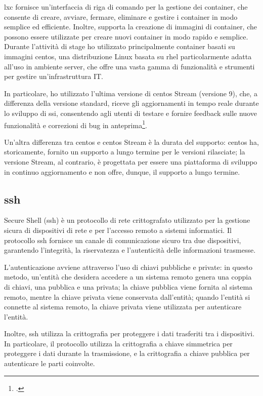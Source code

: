 \acrshort{lxc} fornisce un'interfaccia di riga di comando per la gestione dei container, che consente di creare, avviare, fermare, eliminare e gestire i container in modo semplice ed efficiente. Inoltre, supporta la creazione di immagini di container, che possono essere utilizzate per creare nuovi container in modo rapido e semplice.
\\
Durante l'attività di stage ho utilizzato principalmente container basati su immagini \acrshort{centos}, una distribuzione Linux basata su \acrshort{rhel} particolarmente adatta all'uso in ambiente server, che offre una vasta gamma di funzionalità e strumenti per gestire un'infrastruttura IT. 

In particolare, ho utilizzato l'ultima versione di \acrshort{centos} Stream (versione 9), che, a differenza della versione standard, riceve gli aggiornamenti in tempo reale durante lo sviluppo di \acrshort{ssi}, consentendo agli utenti di testare e fornire feedback sulle nuove funzionalità e correzioni di bug in anteprima\footcite{site:centos-stream}.

Un'altra differenza tra \acrshort{centos} e \acrshort{centos} Stream è la durata del supporto: \acrshort{centos} ha, storicamente, fornito un supporto a lungo termine per le versioni rilasciate; la versione Stream, al contrario, è progettata per essere una piattaforma di sviluppo in continuo aggiornamento e non offre, dunque, il supporto a lungo termine.

\subsection{\acrlong{ssh}}
Secure Shell (\acrshort{ssh}) è un protocollo di rete crittografato utilizzato per la gestione sicura di dispositivi di rete e per l'accesso remoto a sistemi informatici. Il protocollo \acrshort{ssh} fornisce un canale di comunicazione sicuro tra due dispositivi, garantendo l'integrità, la riservatezza e l'autenticità delle informazioni trasmesse.

L'autenticazione avviene attraverso l'uso di chiavi pubbliche e private: in questo metodo, un'entità che desidera accedere a un sistema remoto genera una coppia di chiavi, una pubblica e una privata; la chiave pubblica viene fornita al sistema remoto, mentre la chiave privata viene conservata dall'entità; quando l'entità si connette al sistema remoto, la chiave privata viene utilizzata per autenticare l'entità.

Inoltre, \acrshort{ssh} utilizza la crittografia per proteggere i dati trasferiti tra i dispositivi. In particolare, il protocollo utilizza la crittografia a chiave simmetrica per proteggere i dati durante la trasmissione, e la crittografia a chiave pubblica per autenticare le parti coinvolte.

